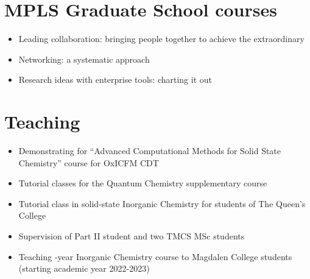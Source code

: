 \documentclass[12pt,a4paper,twoside,nobind]{ociamthesis}
\begin{document}
\section*{MPLS Graduate School courses}
\begin{itemize}
  \item Leading collaboration: bringing people together to achieve the extraordinary
  \item Networking: a systematic approach
  \item Research ideas with enterprise tools: charting it out
\end{itemize}

\section*{Teaching}
\begin{itemize}
  \item Demonstrating for ``Advanced Computational Methods for Solid State Chemistry'' course for OxICFM CDT
  \item Tutorial classes for the Quantum Chemistry supplementary course
  \item Tutorial class in solid-state Inorganic Chemistry for students of The Queen's College
  \item Supervision of Part II student and two TMCS MSc students
  \item Teaching -year Inorganic Chemistry course to Magdalen College students (starting academic year 2022-2023)
\end{itemize}

\clearpage


\end{document}
